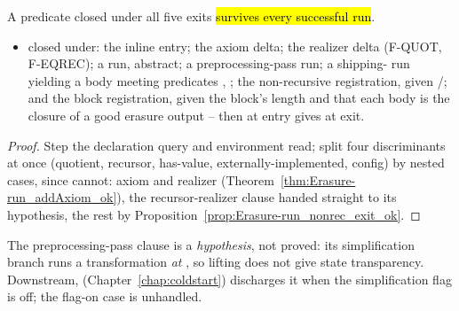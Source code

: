 \begin{proposition}
\label{prop:Erasure-run_visitMutual_ok}
\leanok
{}
 A predicate  closed under all five exits \hl{survives every successful
 run}.
\begin{itemize}
\item {}  closed under: the inline entry; the axiom delta; the realizer delta
(F-QUOT, F-EQREC); a  run, abstract; a preprocessing-pass run; a
shipping- run yielding a body meeting predicates , ; the
non-recursive registration, given /; and the block registration, given the block's
length and that each body is the closure of a good erasure output -- then  at entry gives
 at exit.
\end{itemize}
\end{proposition}
\begin{proof}
\leanok
{}
 Step the declaration query and environment read; split four discriminants at once
(quotient, recursor, has-value, externally-implemented, config) by nested cases, since 
cannot: axiom and realizer (Theorem~\ref{thm:Erasure-run_addAxiom_ok}), the recursor-realizer clause
handed straight to its hypothesis, the rest by Proposition~\ref{prop:Erasure-run_nonrec_exit_ok}.
\end{proof}

\begin{remark}
 The preprocessing-pass clause is a \emph{hypothesis}, not proved: its simplification
branch runs a  transformation \emph{at} , so lifting does not give state
transparency. Downstream,  (Chapter~\ref{chap:coldstart})
discharges it when the simplification flag is off; the flag-on case is unhandled.
\end{remark}

